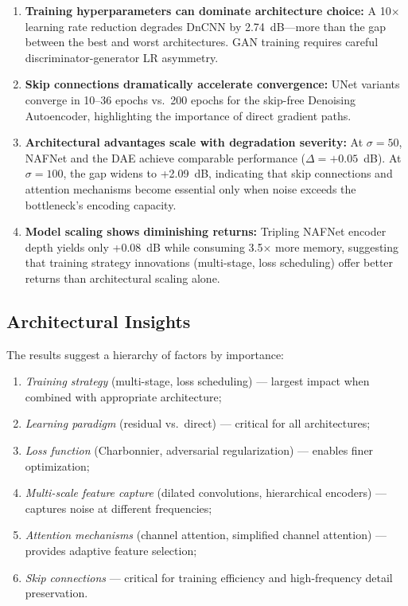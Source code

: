 \begin{enumerate}
    \item \textbf{Training hyperparameters can dominate architecture choice:} A 10$\times$ learning rate reduction degrades DnCNN by 2.74~dB---more than the gap between the best and worst architectures. GAN training requires careful discriminator-generator LR asymmetry.
    
    \item \textbf{Skip connections dramatically accelerate convergence:} UNet variants converge in 10--36 epochs vs.\ 200 epochs for the skip-free Denoising Autoencoder, highlighting the importance of direct gradient paths.
    
    \item \textbf{Architectural advantages scale with degradation severity:} At $\sigma = 50$, NAFNet and the DAE achieve comparable performance ($\Delta = +0.05$~dB). At $\sigma = 100$, the gap widens to +2.09~dB, indicating that skip connections and attention mechanisms become essential only when noise exceeds the bottleneck's encoding capacity.
    
    \item \textbf{Model scaling shows diminishing returns:} Tripling NAFNet encoder depth yields only +0.08~dB while consuming 3.5$\times$ more memory, suggesting that training strategy innovations (multi-stage, loss scheduling) offer better returns than architectural scaling alone.
\end{enumerate}

\subsection{Architectural Insights}

The results suggest a hierarchy of factors by importance:
\begin{enumerate}
    \item \textit{Training strategy} (multi-stage, loss scheduling) --- largest impact when combined with appropriate architecture;
    \item \textit{Learning paradigm} (residual vs.\ direct) --- critical for all architectures;
    \item \textit{Loss function} (Charbonnier, adversarial regularization) --- enables finer optimization;
    \item \textit{Multi-scale feature capture} (dilated convolutions, hierarchical encoders) --- captures noise at different frequencies;
    \item \textit{Attention mechanisms} (channel attention, simplified channel attention) --- provides adaptive feature selection;
    \item \textit{Skip connections} --- critical for training efficiency and high-frequency detail preservation.
\end{enumerate}

